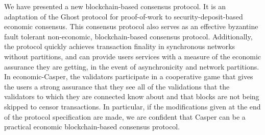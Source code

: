 \documentclass[11pt,a4paper]{article}
\begin{document}
We have presented a new blockchain-based consensus protocol. It is an adaptation of the Ghost protocol for proof-of-work to security-deposit-based economic consensus. This consensus protocol also serves as an effective byzantine fault tolerant non-economic, blockchain-based consensus protocol. Additionally, the protocol quickly achieves transaction finality in synchronous networks without partitions, and can provide users services with a measure of the economic assurance they are getting, in the event of asynchronicity and network partitions. In economic-Casper, the validators participate in a cooperative game that gives the users a strong assurance that they see all of the validations that the validators to which they are connected know about and that blocks are not being skipped to censor transactions. In particular, if the modifications given at the end of the protocol specification are made, we are confident that Casper can be a practical economic blockchain-based consensus protocol.



\end{document}
